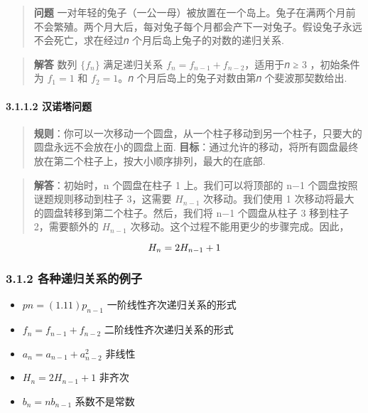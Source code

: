 \begin{quote}
\textbf{问题}
一对年轻的兔子（一公一母）被放置在一个岛上。兔子在满两个月前不会繁殖。两个月大后，每对兔子每个月都会产下一对兔子。假设兔子永远不会死亡，求在经过𝑛
个月后岛上兔子的对数的递归关系.
\end{quote}

\begin{quote}
\textbf{解答} 数列 \(\{f_n\}\) 满足递归关系
\(f_n = f_{n-1}+f_{n-2}\)，适用于𝑛 ≥ 3 ，初始条件为 \(f_1 = 1\) 和
\(f_2 = 1\)。𝑛 个月后岛上的兔子对数由第𝑛 个斐波那契数给出.
\end{quote}

\paragraph{3.1.1.2 汉诺塔问题}\label{ux6c49ux8bfaux5854ux95eeux9898}

\begin{quote}
\textbf{规则}：你可以一次移动一个圆盘，从一个柱子移动到另一个柱子，只要大的圆盘永远不会放在小的圆盘上面.
\textbf{目标}：通过允许的移动，将所有圆盘最终放在第二个柱子上，按大小顺序排列，最大的在底部.
\end{quote}

\begin{quote}
\textbf{解答}：初始时，n 个圆盘在柱子 1 上。我们可以将顶部的 n−1
个圆盘按照谜题规则移动到柱子 3，这需要 \(H_{n−1}\) 次移动。我们使用 1
次移动将最大的圆盘转移到第二个柱子。然后，我们将 n−1 个圆盘从柱子 3
移到柱子 2，需要额外的 \(H_{n−1}\)
次移动。这个过程不能用更少的步骤完成。因此，
\end{quote}

\[
\huge H_n=2H_{n-1}+1
\]

\subsubsection{3.1.2
各种递归关系的例子}\label{ux5404ux79cdux9012ux5f52ux5173ux7cfbux7684ux4f8bux5b50}

\begin{itemize}
\tightlist
\item
  \(pn = (1.11)p_{n-1}\) 一阶线性齐次递归关系的形式
\item
  \(f_n = f_{n-1} + f_{n-2}\) 二阶线性齐次递归关系的形式
\item
  \(a_n=a_{n-1}+a_{n-2}^2\) 非线性
\item
  \(H_n = 2H_{n−1} + 1\) 非齐次
\item
  \(b_n = nb_{n−1}\) 系数不是常数
\end{itemize}

